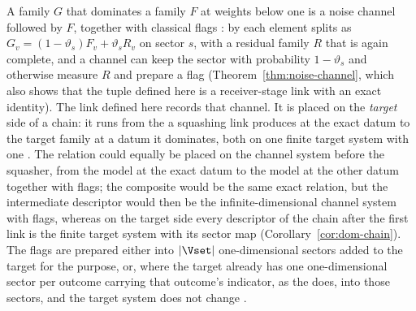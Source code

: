 
A family $G$ that dominates a family $F$ at weights below one is a noise
channel followed by $F$, together with classical flags
\cite[Thm.~3, Eqs.~(20)--(24)]{nahar2025imperfect}: by
 each element splits as
$G_v=(1-\vartheta_s)F_v+\vartheta_sR_v$ on sector $s$, with a residual family $R$
that is again complete, and a channel can keep the sector with probability
$1-\vartheta_s$ and otherwise measure $R$ and prepare a flag
(Theorem~\ref{thm:noise-channel}, which also shows that the tuple defined
here is a receiver-stage link with an exact identity). The link defined here
records that channel. It is placed on the \emph{target} side of a chain: it runs from the
 a squashing link produces at the exact datum to the target
family at a datum it dominates, both on one finite target system with
one . The relation could equally be placed on the channel
system before the squasher, from the model at the exact datum to the model at
the other datum together with flags; the composite would be the same exact
relation, but the intermediate descriptor would then be the
infinite-dimensional channel system with flags, whereas on the target side
every descriptor of the chain after the first link is the finite target
system with its sector map (Corollary~\ref{cor:dom-chain}). The flags are
prepared either into $|\Vset|$ one-dimensional sectors added to the target
for the purpose, or, where the target already has one one-dimensional sector
per outcome carrying that outcome's indicator, as the  does, into those sectors, and the target system does not change
\cite[Technical aside~1]{nahar2025imperfect}.

